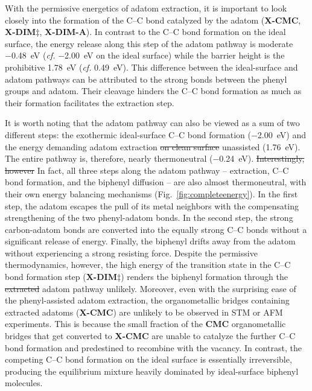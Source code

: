 \documentclass[aps,prb,amsmath,amssymb,11pt]{revtex4-1}
\newcommand{\zhzh}{\color{blue}}
\newcommand{\zhzh}{\color{blue}}
\begin{document}
With the permissive energetics of adatom extraction, it is important to look closely into the formation of the C--C bond catalyzed by the adatom (\textbf{X-CMC}, \textbf{X-DIM$\ddagger$}, \textbf{X-DIM-A}).
In contrast to the C--C bond formation on the ideal surface, the energy release along this step of the adatom pathway is moderate \SI{-0.48}{\electronvolt} (\textit{cf.} \SI{-2.00}{\electronvolt} on the ideal surface) while the barrier height is the prohibitive \SI{1.78}{\electronvolt} (\textit{cf.} \SI{0.49}{\electronvolt}). 
This difference between the ideal-surface and adatom pathways can be attributed to the strong bonds between the phenyl groups and adatom.
Their cleavage  hinders the C--C bond formation as much as their formation facilitates the extraction step.

It is worth noting that the adatom pathway can also be viewed as a sum of two different steps: the exothermic ideal-surface C--C bond formation (\SI{-2.00}{\electronvolt}) and the energy demanding adatom extraction \sout{on clean surface} unassisted (\SI{1.76}{\electronvolt}). 
The entire pathway is, therefore, nearly thermoneutral (\SI{-0.24}{\electronvolt}). 
\sout{Interestingly, however} {\zhzh In fact}, all three steps along the adatom pathway -- extraction, C--C bond
formation, and the biphenyl diffusion -- are also almost thermoneutral, with their own energy balancing mechanisms (Fig.~\ref{fig:completeenergy}). 
In the first step, the adatom escapes the pull of its metal neighbors with the compensating strengthening of the two phenyl-adatom bonds. In the second step, the strong carbon-adatom bonds are converted into the equally strong C--C bonds without a significant release of energy. Finally, the biphenyl drifts away from the adatom without experiencing a strong resisting force. Despite the permissive thermodynamics, however, the high energy of the transition state in the C--C bond formation step (\textbf{X-DIM$\ddagger$}) renders the biphenyl formation through the \sout{extracted} adatom pathway unlikely.
Moreover, even with the surprising ease of the phenyl-assisted adatom extraction, the organometallic bridges containing extracted adatoms (\textbf{X-CMC}) are unlikely to be observed in STM or AFM experiments. This is because the small fraction of the \textbf{CMC} organometallic bridges that get converted to \textbf{X-CMC} are unable to catalyze the further C--C bond formation and predestined to recombine with the vacancy. In contrast, the competing C--C bond formation on the ideal surface is essentially irreversible, producing the equilibrium mixture heavily dominated by ideal-surface biphenyl molecules.
\end{document}
